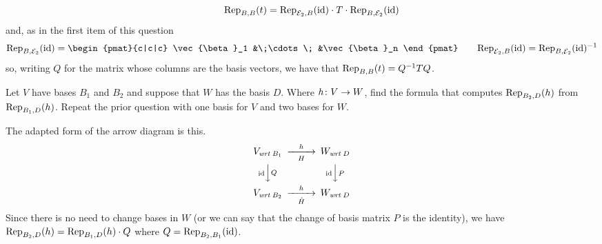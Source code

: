 \begin{exercises}
\begin{answer}
\begin{exparts}
\begin{equation*}
\begin{CD}
            \end{CD}
        \qquad 
            \rep{t}{B,B}=\rep{\identity}{\stdbasis_2,B}
                          \cdot T
                          \cdot \rep{\identity}{B,\stdbasis_2}
          \end{equation*}
          and, as in the first item of this question
          \begin{equation*}
            \rep{\identity}{B,\stdbasis_2}
            =\begin{pmat}{c|c|c}
              \vec{\beta}_1 &\;\cdots\; &\vec{\beta}_n
            \end{pmat}
            \qquad
            \rep{\identity}{\stdbasis_2,B}=\rep{\identity}{B,\stdbasis_2}^{-1}
          \end{equation*}
          so, writing $Q$ for the matrix whose columns are the basis vectors,
          we have that $\rep{t}{B,B}=Q^{-1}TQ$.
      \end{exparts}
    \end{answer}
  \item 
    \begin{exparts}
       \partsitem Let \( V \) have bases \( B_1 \) and \( B_2 \) and 
         suppose that \( W \) has the basis \( D \).
         Where \( \map{h}{V}{W} \), find the formula that computes
         \( \rep{h}{B_2,D} \) from \( \rep{h}{B_1,D} \).
       \partsitem Repeat the prior question with one basis 
         for \( V \) and two bases for \( W \).
     \end{exparts}
     \begin{answer}
       \begin{exparts}
         \partsitem The adapted form of the arrow diagram is this.
           \begin{equation*}
             \begin{CD}
               V_{\wrt{B_1}}                   @>h>H>        W_{\wrt{D}}       \\
               @V\scriptsize\identity VQV      @V\scriptsize\identity VPV \\
               V_{\wrt{B_2}}             @>h>\hat{H}>  W_{\wrt{D}}
             \end{CD}
           \end{equation*}
           Since there is no need to change bases in 
           \( W \) (or we can
           say that the change of basis matrix $P$ is the identity), we have
           \( \rep{h}{B_2,D}=\rep{h}{B_1,D}\cdot Q \) where
           \( Q=\rep{\identity}{B_2,B_1} \).

\end{exparts}
\end{answer}
\end{exercises}
